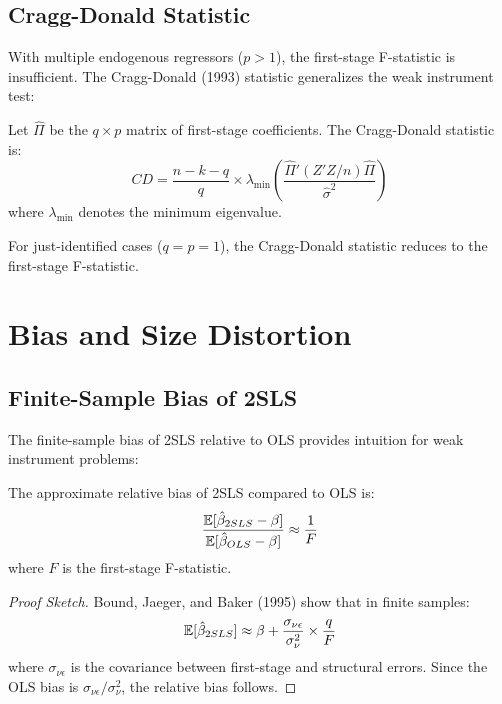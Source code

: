 \subsection{Cragg-Donald Statistic}

With multiple endogenous regressors ($p > 1$), the first-stage F-statistic is insufficient. The Cragg-Donald (1993) statistic generalizes the weak instrument test:

\begin{definition}
\label{def:cragg_donald}
Let $\hat{\Pi}$ be the $q \times p$ matrix of first-stage coefficients. The Cragg-Donald statistic is:
\[
CD = \frac{n - k - q}{q} \times \lambda_{\min}\left(\frac{\hat{\Pi}'(Z'Z/n)\hat{\Pi}}{\hat{\sigma}^2}\right)
\]
where $\lambda_{\min}$ denotes the minimum eigenvalue.
\end{definition}

For just-identified cases ($q = p = 1$), the Cragg-Donald statistic reduces to the first-stage F-statistic.


\section{Bias and Size Distortion}
\label{sec:bias_distortion}

\subsection{Finite-Sample Bias of 2SLS}

The finite-sample bias of 2SLS relative to OLS provides intuition for weak instrument problems:

\begin{theorem}
\label{thm:relative_bias}
The approximate relative bias of 2SLS compared to OLS is:
\[
\frac{\mathbb{E}[\hat{\beta}_{2SLS} - \beta]}{\mathbb{E}[\hat{\beta}_{OLS} - \beta]} \approx \frac{1}{F}
\]
where $F$ is the first-stage F-statistic.
\end{theorem}

\begin{proof}[Proof Sketch]
Bound, Jaeger, and Baker (1995) show that in finite samples:
\[
\mathbb{E}[\hat{\beta}_{2SLS}] \approx \beta + \frac{\sigma_{\nu\epsilon}}{\sigma^2_\nu} \times \frac{q}{F}
\]
where $\sigma_{\nu\epsilon}$ is the covariance between first-stage and structural errors. Since the OLS bias is $\sigma_{\nu\epsilon}/\sigma^2_\nu$, the relative bias follows.
\end{proof}


